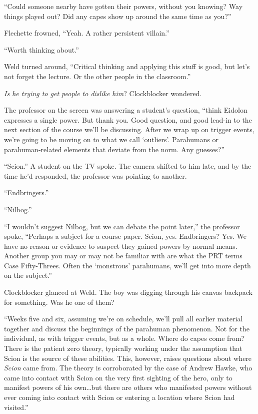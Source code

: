 ``Could someone nearby have gotten their powers, without you knowing?  Way things played out?  Did any capes show up around the same time as you?''



Flechette frowned, ``Yeah.  A rather persistent villain.''



``Worth thinking about.''



Weld turned around, ``Critical thinking and applying this stuff is good, but let's not forget the lecture.  Or the other people in the classroom.''



\emph{Is he trying to get people to dislike him}?  Clockblocker wondered.



The professor on the screen was answering a student's question, ``\ldotsI think Eidolon expresses a single power.  But thank you.  Good question, and good lead-in to the next section of the course we'll be discussing.  After we wrap up on trigger events, we're going to be moving on to what we call `outliers'.  Parahumans or parahuman-related elements that deviate from the norm.  Any guesses?''



``Scion.'' A student on the TV spoke.  The camera shifted to him late, and by the time he'd responded, the professor was pointing to another.



``Endbringers.''



``Nilbog.''



``I wouldn't suggest Nilbog, but we can debate the point later,'' the professor spoke, ``Perhaps a subject for a course paper.  Scion, yes.  Endbringers?  Yes.  We have no reason or evidence to suspect they gained powers by normal means.  Another group you may or may not be familiar with are what the PRT terms Case Fifty-Threes.  Often the `monstrous' parahumans, we'll get into more depth on the subject.''



Clockblocker glanced at Weld.  The boy was digging through his canvas backpack for something.  Was he one of them?



``Weeks five and six, assuming we're on schedule, we'll pull all earlier material together and discuss the beginnings of the parahuman phenomenon.  Not for the individual, as with trigger events, but as a whole.  Where do capes come from?  There is the patient zero theory, typically working under the assumption that Scion is the source of these abilities.  This, however, raises questions about where \emph{Scion} came from.  The theory is corroborated by the case of Andrew Hawke, who came into contact with Scion on the very first sighting of the hero, only to manifest powers of his own\ldots but there are others who manifested powers without ever coming into contact with Scion or entering a location where Scion had visited.''



